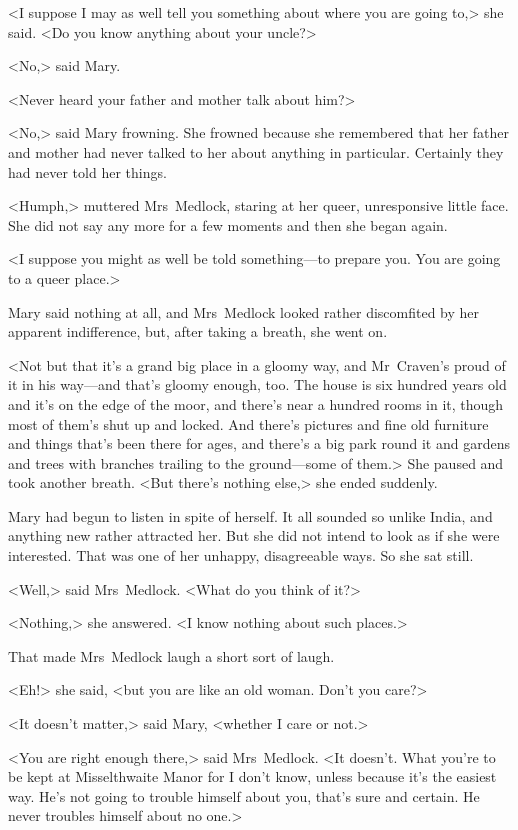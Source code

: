 <I suppose I may as well tell you something about where you are going to,> she said. <Do you know anything about your uncle?>

<No,> said Mary.

<Never heard your father and mother talk about him?>

<No,> said Mary frowning. She frowned because she remembered that her father and mother had never talked to her about anything in particular. Certainly they had never told her things.

<Humph,> muttered Mrs~Medlock, staring at her queer, unresponsive little face. She did not say any more for a few moments and then she began again.

<I suppose you might as well be told something—to prepare you. You are going to a queer place.>

Mary said nothing at all, and Mrs~Medlock looked rather discomfited by her apparent indifference, but, after taking a breath, she went on.

<Not but that it's a grand big place in a gloomy way, and Mr~Craven's proud of it in his way—and that's gloomy enough, too. The house is six hundred years old and it's on the edge of the moor, and there's near a hundred rooms in it, though most of them's shut up and locked. And there's pictures and fine old furniture and things that's been there for ages, and there's a big park round it and gardens and trees with branches trailing to the ground—some of them.> She paused and took another breath. <But there's nothing else,> she ended suddenly.

Mary had begun to listen in spite of herself. It all sounded so unlike India, and anything new rather attracted her. But she did not intend to look as if she were interested. That was one of her unhappy, disagreeable ways. So she sat still.

<Well,> said Mrs~Medlock. <What do you think of it?>

<Nothing,> she answered. <I know nothing about such places.>

That made Mrs~Medlock laugh a short sort of laugh.

<Eh!> she said, <but you are like an old woman. Don't you care?>

<It doesn't matter,> said Mary, <whether I care or not.>

<You are right enough there,> said Mrs~Medlock. <It doesn't. What you're to be kept at Misselthwaite Manor for I don't know, unless because it's the easiest way. He's not going to trouble himself about you, that's sure and certain. He never troubles himself about no one.>

